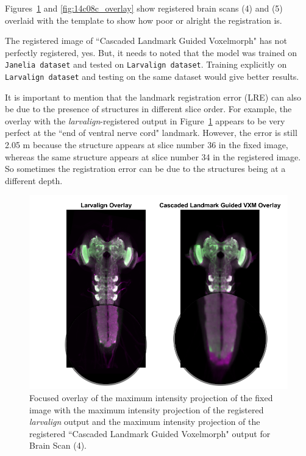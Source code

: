 \documentclass{book}
\begin{document}
	\begin{table}[H]
		\centering
		
		\caption{One-to-one comparison of landmark registration error (LRE) for Brain Scan 4 and 5 for \textit{larvalign}-registered output and ``Cascaded Landmark Guided Voxelmorph"-registered output at landmark locations ``Right/Left A7 Nerve Entry Points" and ``End of Ventral Nerve Cord".}
		\label{table:brain45_lre}
	\end{table}
	
	Figures~\ref{fig:14c08b_overlay} and \ref{fig:14c08c_overlay} show registered brain scans (4) and (5) overlaid with the template to show how poor or alright the registration is.

	The registered image of ``Cascaded Landmark Guided Voxelmorph" has not perfectly registered, yes. But, it needs to noted that the model was trained on \texttt{Janelia dataset} and tested on \texttt{Larvalign dataset}. Training explicitly on \texttt{Larvalign dataset} and testing on the same dataset would give better results.
	
	It is important to mention that the landmark registration error (LRE) can also be due to the presence of structures in different slice order. For example, the overlay with the \textit{larvalign}-registered output in Figure~\ref{fig:14c08b_overlay} appears to be very perfect at the ``end of ventral nerve cord" landmark. However, the error is still 2.05 \textmu m because the structure appears at slice number 36 in the fixed image, whereas the same structure appears at slice number 34 in the registered image. So sometimes the registration error can be due to the structures being at a different depth.
	
	\begin{figure}[h!]
		\centering
		\includegraphics[width=0.7\columnwidth]{resources/chapter7/LRE_Visual/14c08b_overlay_zoomed.png}
		\caption{Focused overlay of the maximum intensity projection of the fixed image with the maximum intensity projection of the registered \textit{larvalign} output and the maximum intensity projection of the registered ``Cascaded Landmark Guided Voxelmorph" output for Brain Scan (4).}
		\label{fig:14c08b_overlay}
	\end{figure}
	
\end{document}

